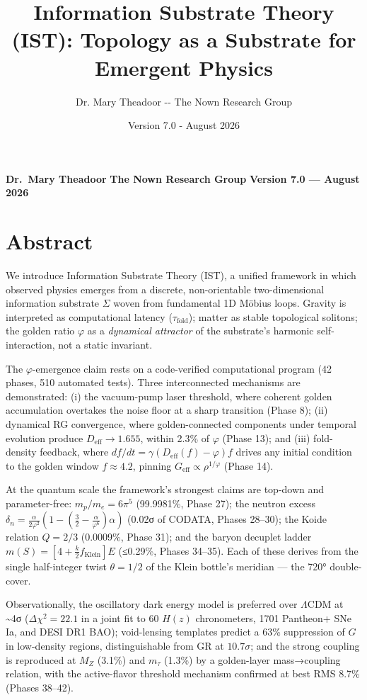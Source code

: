 \documentclass[
  11pt,
]{article}
\title{Information Substrate Theory (IST): Topology as a Substrate for
Emergent Physics}
\author{Dr. Mary Theadoor -\/- The Nown Research Group}
\date{Version 7.0 - August 2026}
\begin{document}
\maketitle

{
\setcounter{tocdepth}{3}
\tableofcontents
}
\textbf{Dr.~Mary Theadoor} \textbf{The Nown Research Group}
\textbf{Version 7.0 --- August 2026}

\section{Abstract}\label{abstract}

We introduce Information Substrate Theory (IST), a unified framework in
which observed physics emerges from a discrete, non-orientable
two-dimensional information substrate \(\Sigma\) woven from fundamental
1D Möbius loops. Gravity is interpreted as computational latency
(\(\tau_{\text{fold}}\)); matter as stable topological solitons; the
golden ratio \(\varphi\) as a \emph{dynamical attractor} of the
substrate's harmonic self-interaction, not a static invariant.

The \(\varphi\)-emergence claim rests on a code-verified computational
program (42 phases, 510 automated tests). Three interconnected
mechanisms are demonstrated: (i) the vacuum-pump laser threshold, where
coherent golden accumulation overtakes the noise floor at a sharp
transition (Phase 8); (ii) dynamical RG convergence, where
golden-connected components under temporal evolution produce
\(D_{\text{eff}} \to 1.655\), within 2.3\% of \(\varphi\) (Phase 13);
and (iii) fold-density feedback, where
\(df/dt = \gamma(D_{\text{eff}}(f) - \varphi)f\) drives any initial
condition to the golden window \(f \approx 4.2\), pinning
\(G_{\text{eff}} \propto \rho^{1/\varphi}\) (Phase 14).

At the quantum scale the framework's strongest claims are top-down and
parameter-free: \(m_p/m_e = 6\pi^5\) (99.9981\%, Phase 27); the neutron
excess
\(\delta_n = \frac{\alpha}{2\varphi^2}(1 - (\frac{3}{2} - \frac{\alpha}{\varphi^6})\alpha)\)
(0.02σ of CODATA, Phases 28--30); the Koide relation \(Q = 2/3\)
(0.0009\%, Phase 31); and the baryon decuplet ladder
\(m(S) = [4 + \frac{k}{2}f_{\text{Klein}}]E\) (≤0.29\%, Phases 34--35).
Each of these derives from the single half-integer twist
\(\theta = 1/2\) of the Klein bottle's meridian --- the 720°
double-cover.

Observationally, the oscillatory dark energy model is preferred over
\(\Lambda\)CDM at \textasciitilde4σ (\(\Delta\chi^2 = 22.1\) in a joint
fit to 60 \(H(z)\) chronometers, 1701 Pantheon+ SNe Ia, and DESI DR1
BAO); void-lensing templates predict a 63\% suppression of \(G\) in
low-density regions, distinguishable from GR at \(10.7\sigma\); and the
strong coupling is reproduced at \(M_Z\) (3.1\%) and \(m_\tau\) (1.3\%)
by a golden-layer mass→coupling relation, with the active-flavor
threshold mechanism confirmed at best RMS 8.7\% (Phases 38--42).
\end{document}
